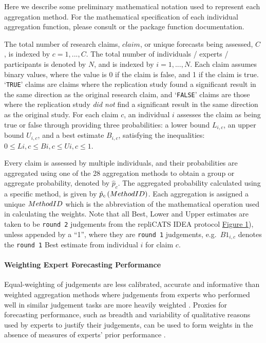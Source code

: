 \documentclass[article]{jss}
\let\oldparagraph\paragraph
\renewcommand{\paragraph}[1]{\oldparagraph{#1}\mbox{}}
\begin{document}
Here we describe some preliminary mathematical notation used to
represent each aggregation method. For the mathematical specification of
each individual aggregation function, please consult \citep{Hanea2021}
or the  package function documentation.

The total number of research claims, \(claim\), or unique forecasts
being assessed, \(C\) , is indexed by \(c = 1, ..., C\). The total
number of individuals / experts / participants is denoted by \(N\), and
is indexed by \(i = 1, ..., N\). Each claim assumes binary values, where
the value is 0 if the claim is false, and 1 if the claim is true.
`\texttt{TRUE}' claims are claims where the replication study found a
significant result in the same direction as the original research claim,
and `\texttt{FALSE}' claims are those where the replication study
\emph{did not} find a significant result in the same direction as the
original study. For each claim \(c\), an individual \(i\) assesses the
claim as being true or false through providing three probabilities: a
lower bound \({L}_{i,c}\), an upper bound \({U}_{i,c}\), and a best
estimate \(B_{i,c}\), satisfying the inequalities:
\(0 \le Li,c \le Bi,c \le Ui,c \le 1\).

Every claim is assessed by multiple individuals, and their probabilities
are aggregated using one of the 28 aggregation methods to obtain a group
or aggregate probability, denoted by \(\hat{p}_c\). The aggregated
probability calculated using a specific method, is given by
\(\hat{p}_{c}\left(Method \space ID \right)\). Each aggregation is
assigned a unique \(Method \space ID\) which is the abbreviation of the
mathematical operation used in calculating the weights. Note that all
Best, Lower and Upper estimates are taken to be \texttt{round\ 2}
judgements from the repliCATS IDEA protocol
\protect\hyperlink{fig1}{Figure 1}), unless appended by a ``1'', where
they are \texttt{round\ 1} judgements, e.g.~\(B1_{i,c}\) denotes the
\texttt{round\ 1} Best estimate from individual \(i\) for claim \(c\).

\hypertarget{weighting-expert-forecasting-performance}{%
\paragraph{Weighting Expert Forecasting
Performance}\label{weighting-expert-forecasting-performance}}

Equal-weighting of judgements are less calibrated, accurate and
informative than weighted aggregation methods where judgements from
experts who performed well in similar judgement tasks are more heavily
weighted \citep{Hanea2021}. Proxies for forecasting performance, such as
breadth and variability of qualitative reasons used by experts to
justify their judgements, can be used to form weights in the absence of
measures of experts' prior performance \citep{Hanea2021}.
\end{document}

